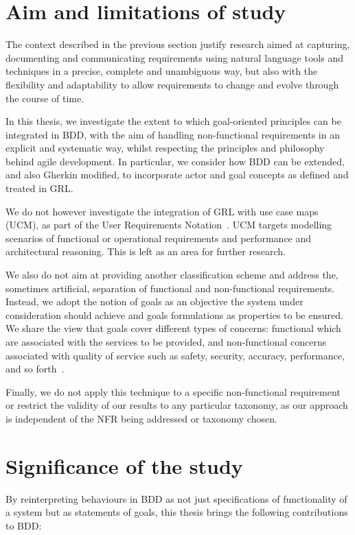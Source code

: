 \documentclass[dissertation,final]{softeng}
\begin{document}
{\section{Aim and limitations of study}
The context described in the previous section justify research aimed at capturing, documenting and communicating requirements using natural language tools and techniques in a precise, complete and unambiguous way, but also with the flexibility and adaptability to allow requirements to change and evolve through the course of time.

In this thesis, we investigate the extent to which goal-oriented principles can be integrated in BDD, with the aim of handling non-functional requirements in an explicit and systematic way, whilst respecting the principles and philosophy behind agile development. In particular, we consider how BDD can be extended, and also Gherkin modified, to incorporate actor and goal concepts as defined and treated in GRL.

We do not however investigate the integration of GRL with use case maps (UCM), as part of the User Requirements Notation~\citep{liu2004designing}. UCM targets modelling scenarios of functional or operational requirements and performance and architectural reasoning. This is left as an area for further research.

We also do not aim at providing another classification scheme and address the, sometimes artificial, separation of functional and non-functional requirements. Instead, we adopt the notion of goals as an objective the system under consideration should achieve and goals formulations as properties to be ensured. We share the view that goals cover different types of concerns: functional which are associated with the services to be provided, and non-functional concerns associated with quality of service such as safety, security, accuracy, performance, and so forth~\citep{Lamsweerde:2001wpba}.

Finally, we do not apply this technique to a specific non-functional requirement or restrict the validity of our results to any particular taxonomy, as our approach is independent of the NFR being addressed or taxonomy chosen.

\section{Significance of the study}

By reinterpreting behaviours in BDD as not just specifications of functionality of a system but as statements of goals, this thesis brings the following contributions to BDD:

}
\end{document}
